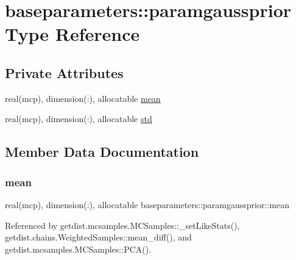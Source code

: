 \hypertarget{structbaseparameters_1_1paramgaussprior}{}\section{baseparameters\+:\+:paramgaussprior Type Reference}
\label{structbaseparameters_1_1paramgaussprior}
\subsection*{Private Attributes}
\begin{DoxyCompactItemize}
\item 
real(mcp), dimension(\+:), allocatable \mbox{\hyperlink{structbaseparameters_1_1paramgaussprior_a39289afe4b0b1f0300a5f0e9aeda2edc}{mean}}
\item 
real(mcp), dimension(\+:), allocatable \mbox{\hyperlink{structbaseparameters_1_1paramgaussprior_a36682eb9d288e67410c3c6bedfbf0c27}{std}}
\end{DoxyCompactItemize}


\subsection{Member Data Documentation}
\mbox{\label{structbaseparameters_1_1paramgaussprior_a39289afe4b0b1f0300a5f0e9aeda2edc}} 
\subsubsection{\texorpdfstring{mean}{mean}}
{\footnotesize\ttfamily real(mcp), dimension(\+:), allocatable baseparameters\+::paramgaussprior\+::mean\hspace{0.3cm}{\ttfamily [private]}}



Referenced by getdist.\+mcsamples.\+M\+C\+Samples\+::\+\_\+set\+Like\+Stats(), getdist.\+chains.\+Weighted\+Samples\+::mean\+\_\+diff(), and getdist.\+mcsamples.\+M\+C\+Samples\+::\+P\+C\+A().

\mbox{\label{structbaseparameters_1_1paramgaussprior_a36682eb9d288e67410c3c6bedfbf0c27}} 
